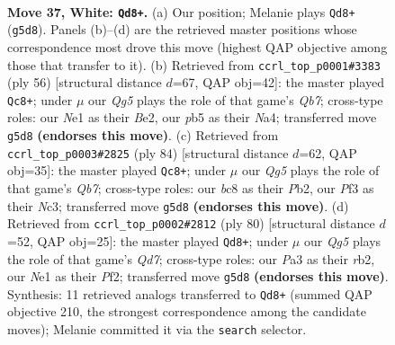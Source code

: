 \documentclass[11pt]{article}
\begin{document}
\clearpage

\begin{figure}[p]\centering
\begin{subfigure}{0.46\textwidth}\centering
\resizebox{\linewidth}{!}{%
\newchessgame
\chessboard[
  setfen={n1b2k1r/8/8/1p4Q1/6pp/P2P1P2/7K/4Nq2 w - - 4 37},
  showmover=false,
  pgfstyle=straightmove, color=movearrow, markmove={g5-d8}
]}
\caption{}
\end{subfigure}\hfill
\begin{subfigure}{0.46\textwidth}\centering
\resizebox{\linewidth}{!}{%
\newchessgame
\chessboard[
  setfen={7k/1Q6/p1n4p/3pb3/N7/4P3/PP2Bq1P/7K w - - 1 29},
  showmover=false,
  pgfstyle=straightmove, color=movearrow, markmove={b7-c8}
]}
\caption{}
\end{subfigure}
\\[4pt]
\begin{subfigure}{0.46\textwidth}\centering
\resizebox{\linewidth}{!}{%
\newchessgame
\chessboard[
  setfen={5k2/1Q6/p3p3/1p2P3/1P3q2/2N2r2/KPP5/8 w - - 9 43},
  showmover=false,
  pgfstyle=straightmove, color=movearrow, markmove={b7-c8}
]}
\caption{}
\end{subfigure}\hfill
\begin{subfigure}{0.46\textwidth}\centering
\resizebox{\linewidth}{!}{%
\newchessgame
\chessboard[
  setfen={8/3Q4/3ppk1p/1P6/1P1P3N/7p/1r3P1K/5q2 w - - 5 41},
  showmover=false,
  pgfstyle=straightmove, color=movearrow, markmove={d7-d8}
]}
\caption{}
\end{subfigure}
\caption{\textbf{Move 37, White: \texttt{Qd8+}.} (a) Our position; Melanie plays \texttt{Qd8+} (\texttt{g5d8}). Panels (b)--(d) are the retrieved master positions whose correspondence most drove this move (highest QAP objective among those that transfer to it). (b) Retrieved from \texttt{ccrl\_top\_p0001\#3383} (ply 56) [structural distance $d$=67, QAP obj=42]: the master played \texttt{Qc8+}; under $\mu$ our \emph{Qg5} plays the role of that game's \emph{Qb7}; cross-type roles: our \emph{N}e1 as their \emph{B}e2, our \emph{p}b5 as their \emph{N}a4; transferred move \texttt{g5d8} \textbf{(endorses this move)}. (c) Retrieved from \texttt{ccrl\_top\_p0003\#2825} (ply 84) [structural distance $d$=62, QAP obj=35]: the master played \texttt{Qc8+}; under $\mu$ our \emph{Qg5} plays the role of that game's \emph{Qb7}; cross-type roles: our \emph{b}c8 as their \emph{P}b2, our \emph{P}f3 as their \emph{N}c3; transferred move \texttt{g5d8} \textbf{(endorses this move)}. (d) Retrieved from \texttt{ccrl\_top\_p0002\#2812} (ply 80) [structural distance $d$=52, QAP obj=25]: the master played \texttt{Qd8+}; under $\mu$ our \emph{Qg5} plays the role of that game's \emph{Qd7}; cross-type roles: our \emph{P}a3 as their \emph{r}b2, our \emph{N}e1 as their \emph{P}f2; transferred move \texttt{g5d8} \textbf{(endorses this move)}. Synthesis: 11 retrieved analogs transferred to \texttt{Qd8+} (summed QAP objective 210, the strongest correspondence among the candidate moves); Melanie committed it via the \texttt{search} selector.}
\label{fig:thought-m72}
\end{figure}
\end{document}
